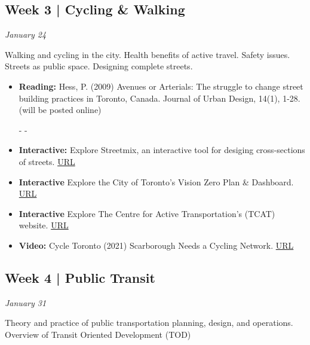 \documentclass[11pt]{article}
\begin{document}
	\subsection*{Week 3 | Cycling \& Walking}
	
	\textit{January 24}
	
	Walking and cycling in the city. Health benefits of active travel. Safety issues. Streets as public space. Designing complete streets. 
	
	\begin{itemize}
		\item \textbf{Reading:} Hess, P. (2009) Avenues or Arterials: The struggle to change street building practices in Toronto, Canada. Journal of Urban Design, 14(1), 1-28. (will be posted online)
		
		- -
		
		\item \textbf{Interactive:} Explore Streetmix, an interactive tool for desiging cross-sections of streets. \href{https://streetmix.net}{URL}
		
		\item \textbf{Interactive} Explore the City of Toronto's Vision Zero Plan \& Dashboard. \href{https://www.toronto.ca/services-payments/streets-parking-transportation/road-safety/vision-zero/vision-zero-dashboard/}{URL}
		
		\item \textbf{Interactive} Explore The Centre for Active Transportation's (TCAT) website. \href{https://www.tcat.ca/}{URL}
		
		\item \textbf{Video:} Cycle Toronto (2021) Scarborough Needs a Cycling Network. \href{https://www.youtube.com/watch?v=gnwhc9fBa5k}{URL}
		
	\end{itemize}
	
	
	

	

		
	\subsection*{Week 4 | Public Transit}
	
	\textit{January 31}
	
	Theory and practice of public transportation planning, design, and operations. Overview of Transit Oriented Development (TOD)
	
\end{document}
